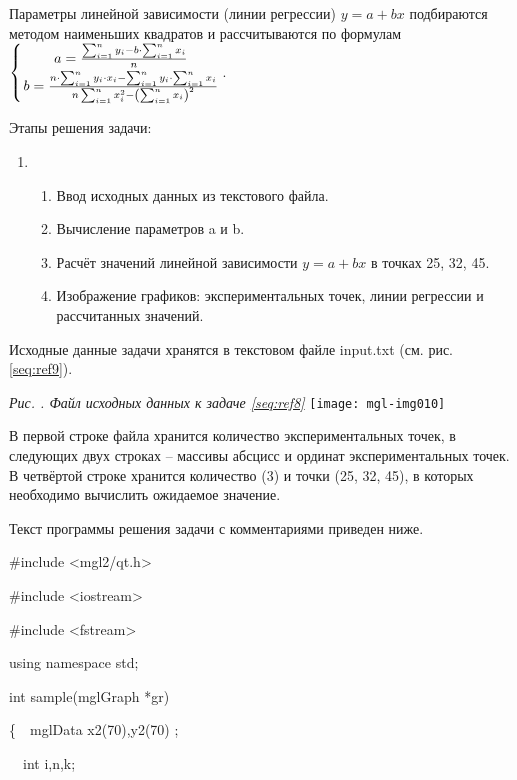 Параметры линейной зависимости (линии регрессии) $y=a+\mathit{bx}$ подбираются методом наименьших квадратов и
рассчитываются по формулам  $\left\{\genfrac{}{}{0pt}{0}{a=\frac{\sum _{i=1}^{n}y_{i}-b\cdot \sum
_{i=1}^{n}x_{i}}{n}}{b=\frac{n\cdot \sum _{i=1}^{n}{y_{i}\cdot x_{i}-\sum _{i=1}^{n}y_{i}\cdot \sum
_{i=1}^{n}x_{i}}}{n\sum _{i=1}^{n}{x_{i}^{2}}-\left(\sum _{i=1}^{n}x_{i}\right)^{2}}}\right.$.

Этапы решения задачи:

\begin{enumerate}
\item \begin{enumerate}
\item Ввод исходных данных из текстового файла.
\item Вычисление параметров a и b.
\item Расчёт значений линейной зависимости  $y=a+bx$ в точках  25, 32, 45.
\item Изображение графиков: экспериментальных точек, линии регрессии и рассчитанных значений.
\end{enumerate}
\end{enumerate}
Исходные данные задачи хранятся в текстовом файле input.txt (см. рис. \ref{seq:ref9}). 

\begin{minipage}{11.88cm}
{\itshape
Рис. {\theqwertya\label{seq:ref9}}. Файл исходных данных к задаче \ref{seq:ref8}}
\texttt{[image: mgl-img010]}\end{minipage}

В первой строке файла хранится количество экспериментальных точек, в следующих двух строках – массивы абсцисс и ординат
экспериментальных точек. В четвёртой строке хранится количество (3) и точки (25, 32, 45), в которых необходимо
вычислить ожидаемое значение.

Текст программы решения задачи с комментариями приведен ниже.

{\upshape
\#include {\textless}mgl2/qt.h{\textgreater}}

{\upshape
\#include {\textless}iostream{\textgreater}}

{\upshape
\#include {\textless}fstream{\textgreater}}

{\upshape
using namespace std;}

{\upshape
int sample(mglGraph *gr)}

{\upshape
\{\ \ mglData x2(70),y2(70) ;}

{\upshape
\ \ int i,n,k; }

